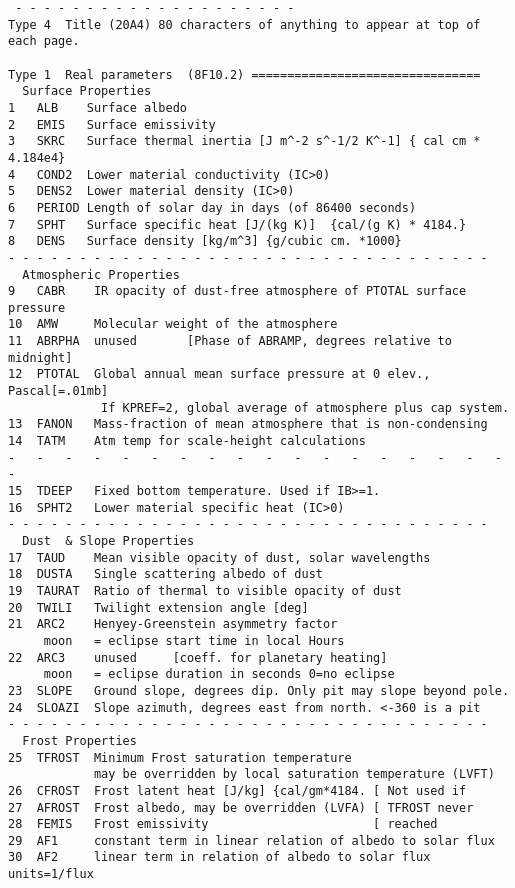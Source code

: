 \documentclass[draft]{article}  %
\begin{document}
\begin{verbatim}
 - - - - - - - - - - - - - - - - - - - -
Type 4	Title (20A4) 80 characters of anything to appear at top of each page.

Type 1	Real parameters  (8F10.2) ================================
  Surface Properties
1   ALB    Surface albedo
2   EMIS   Surface emissivity
3   SKRC   Surface thermal inertia [J m^-2 s^-1/2 K^-1] { cal cm * 4.184e4}
4   COND2  Lower material conductivity (IC>0)
5   DENS2  Lower material density (IC>0)
6   PERIOD Length of solar day in days (of 86400 seconds)
7   SPHT   Surface specific heat [J/(kg K)]  {cal/(g K) * 4184.}
8   DENS   Surface density [kg/m^3] {g/cubic cm. *1000}
- - - - - - - - - - - - - - - - - - - - - - - - - - - - - - - - - - 
  Atmospheric Properties
9   CABR    IR opacity of dust-free atmosphere of PTOTAL surface pressure
10  AMW     Molecular weight of the atmosphere
11  ABRPHA  unused       [Phase of ABRAMP, degrees relative to midnight] 
12  PTOTAL  Global annual mean surface pressure at 0 elev., Pascal[=.01mb]
             If KPREF=2, global average of atmosphere plus cap system.
13  FANON   Mass-fraction of mean atmosphere that is non-condensing
14  TATM    Atm temp for scale-height calculations
-   -   -   -   -   -   -   -   -   -   -   -   -   -   -   -   -   -   -   
15  TDEEP   Fixed bottom temperature. Used if IB>=1.
16  SPHT2   Lower material specific heat (IC>0)
- - - - - - - - - - - - - - - - - - - - - - - - - - - - - - - - - - 
  Dust  & Slope Properties
17  TAUD    Mean visible opacity of dust, solar wavelengths
18  DUSTA   Single scattering albedo of dust
19  TAURAT  Ratio of thermal to visible opacity of dust
20  TWILI   Twilight extension angle [deg]
21  ARC2    Henyey-Greenstein asymmetry factor
     moon   = eclipse start time in local Hours
22  ARC3    unused     [coeff. for planetary heating] 
     moon   = eclipse duration in seconds 0=no eclipse
23  SLOPE   Ground slope, degrees dip. Only pit may slope beyond pole.
24  SLOAZI  Slope azimuth, degrees east from north. <-360 is a pit
- - - - - - - - - - - - - - - - - - - - - - - - - - - - - - - - - - 
  Frost Properties
25  TFROST  Minimum Frost saturation temperature
            may be overridden by local saturation temperature (LVFT)
26  CFROST  Frost latent heat [J/kg] {cal/gm*4184. [ Not used if
27  AFROST  Frost albedo, may be overridden (LVFA) [ TFROST never
28  FEMIS   Frost emissivity                       [ reached
29  AF1     constant term in linear relation of albedo to solar flux
30  AF2     linear term in relation of albedo to solar flux units=1/flux

\end{verbatim}
\end{document}
